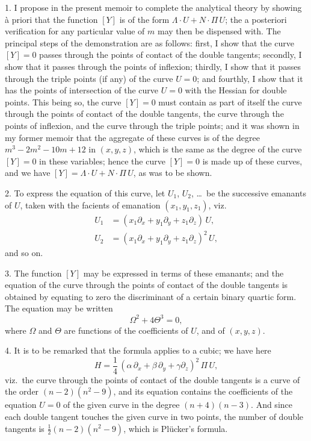 \documentclass[11pt,a4paper]{article}
\theoremstyle{plain}
\theoremstyle{definition}
\begin{document}
1. I propose in the present memoir to complete the analytical theory by showing \`{a} priori that the function $[Y]$ is of the form $\Lambda \cdot U + N \cdot \Pi\,U$; the a posteriori verification for any particular value of $m$ may then be dispensed with. The principal steps of the demonstration are as follows: first, I show that the curve $[Y]=0$ passes through the points of contact of the double tangents; secondly, I show that it passes through the points of inflexion; thirdly, I show that it passes through the triple points (if any) of the curve $U=0$; and fourthly, I show that it has the points of intersection of the curve $U=0$ with the Hessian for double points. This being so, the curve $[Y]=0$ must contain as part of itself the curve through the points of contact of the double tangents, the curve through the points of inflexion, and the curve through the triple points; and it was shown in my former memoir that the aggregate of these curves is of the degree $m^3-2m^2-10m+12$ in $(x, y, z)$, which is the same as the degree of the curve $[Y]=0$ in these variables; hence the curve $[Y]=0$ is made up of these curves, and we have $[Y] = \Lambda \cdot U + N \cdot \Pi\,U$, as was to be shown.

2. To express the equation of this curve, let $U_1$, $U_2$, \ldots\ be the successive emanants of $U$, taken with the facients of emanation $(x_1, y_1, z_1)$, viz.
\begin{align*}
U_1 &= (x_1\partial_x + y_1\partial_y + z_1\partial_z)\,U, \\
U_2 &= (x_1\partial_x + y_1\partial_y + z_1\partial_z)^2\,U,
\end{align*}
and so on.

3. The function $[Y]$ may be expressed in terms of these emanants; and the equation of the curve through the points of contact of the double tangents is obtained by equating to zero the discriminant of a certain binary quartic form. The equation may be written
\[
\Omega^2 + 4\Theta^3 = 0,
\]
where $\Omega$ and $\Theta$ are functions of the coefficients of $U$, and of $(x, y, z)$.

4. It is to be remarked that the formula applies to a cubic; we have here
\[
H = \frac{1}{4}\,(\alpha\,\partial_x + \beta\,\partial_y + \gamma\partial_z)^2\, \Pi\,U,
\]
viz.\ the curve through the points of contact of the double tangents is a curve of the order $(n-2)(n^2-9)$, and its equation contains the coefficients of the equation $U=0$ of the given curve in the degree $(n+4)(n-3)$. And since each double tangent touches the given curve in two points, the number of double tangents is $\frac{1}{2}(n-2)(n^2-9)$, which is Pl\"{u}cker's formula.
\end{document}

